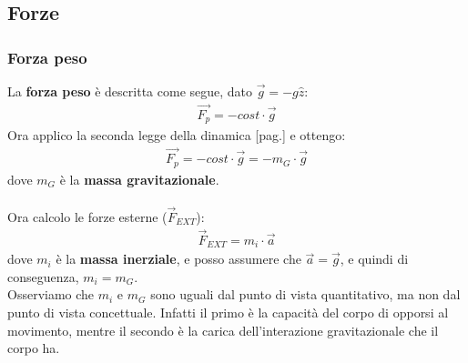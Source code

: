     \subsection{Forze}

        \subsubsection{Forza peso}
            La \textbf{forza peso} è descritta come segue, dato $\vec{g} = -g\hat{z}$:
            \begin{align*}
                \vec{F_p} = - cost\cdot \vec{g}
            \end{align*}
            Ora applico la seconda legge della dinamica [pag.\pageref{II_legge_dinamica}] e ottengo:
            \begin{align*}
                \vec{F_p} = - cost\cdot \vec{g} = - m_G\cdot \vec{g}
            \end{align*}
            dove $m_G$ è la \textbf{massa gravitazionale}.\\\\
            Ora calcolo le forze esterne ($\vec{F}_{EXT}$):
            \begin{align*}
                \vec{F}_{EXT} = m_i\cdot\vec{a}
            \end{align*}
            dove $m_i$ è la \textbf{massa inerziale}, e posso assumere che $\vec{a} = \vec{g}$, e quindi di conseguenza, $m_i = m_G$.\\
            Osserviamo che $m_i$ e $m_G$ sono uguali dal punto di vista quantitativo, ma non dal punto di vista concettuale. Infatti il primo è la capacità del corpo di opporsi al movimento, mentre il secondo è la carica dell'interazione gravitazionale che il corpo ha.

